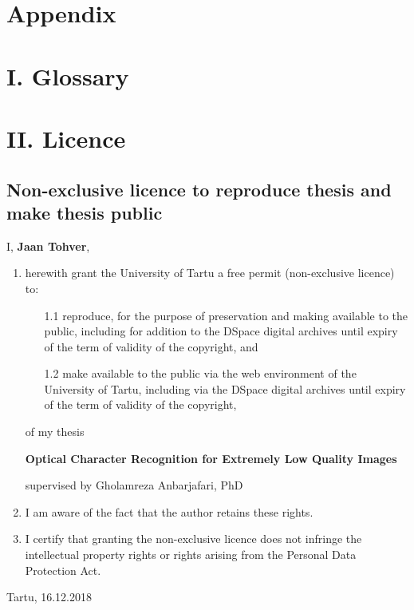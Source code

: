 \documentclass[12pt]{article}
\begin{document}
\newpage

{\section*{Appendix}
}

\newpage

\section*{I. Glossary}

\newpage

\section*{II. Licence}


\subsection*{Non-exclusive licence to reproduce thesis and make thesis public}

I, \textbf{Jaan Tohver},

\begin{enumerate}
\item
herewith grant the University of Tartu a free permit (non-exclusive licence) to:
\begin{enumerate}
\item[1.1]
reproduce, for the purpose of preservation and making available to the public, including for addition to the DSpace digital archives until expiry of the term of validity of the copyright, and
\item[1.2]
make available to the public via the web environment of the University of Tartu, including via the DSpace digital archives until expiry of the term of validity of the copyright,
\end{enumerate}

of my thesis

\textbf{Optical Character Recognition for Extremely Low Quality Images}

supervised by Gholamreza Anbarjafari, PhD

\item
I am aware of the fact that the author retains these rights.
\item
I certify that granting the non-exclusive licence does not infringe the intellectual property rights or rights arising from the Personal Data Protection Act. 
\end{enumerate}

\noindent
Tartu, 16.12.2018
\end{document}
